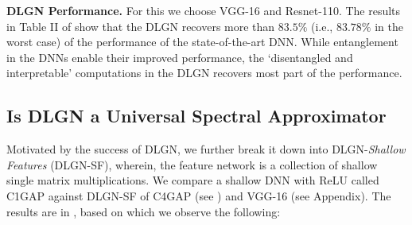 


\textbf{DLGN Performance.} For this we choose VGG-16 and Resnet-110. The results in Table II of  show that the DLGN recovers more than $83.5\%$ (i.e., $83.78\%$ in the worst case) of the performance of the state-of-the-art DNN. %
While entanglement in the DNNs enable their improved performance,  the `disentangled and interpretable'  computations in the DLGN recovers most part of the performance. %

\subsection{Is DLGN a Universal Spectral Approximator}
Motivated by the success of DLGN, we further break it down into DLGN-\emph{Shallow Features} (DLGN-SF), wherein, the feature network is a collection of shallow single matrix multiplications. We compare a shallow DNN with ReLU called C1GAP against DLGN-SF of C4GAP (see ) and VGG-16 (see Appendix). The results are in , based on which we observe the following:

